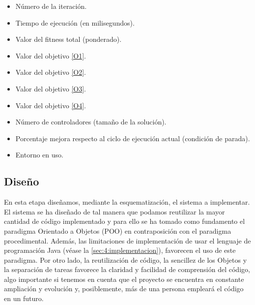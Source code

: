 \begin{enumerate}[label={\textbf{RIO\arabic*}}, ref={Requisito RIO\arabic*},  align=left]
\begin{enumerate}[label*={\textbf{.\arabic*}}]
\begin{itemize}
			\item Número de la iteración.
			\item Tiempo de ejecución (en milisegundos).
			\item Valor del fitness total (ponderado).
			\item Valor del objetivo \ref{O1}.
			\item Valor del objetivo \ref{O2}.
			\item Valor del objetivo \ref{O3}.
			\item Valor del objetivo \ref{O4}.
			\item Número de controladores (tamaño de la solución).
			\item Porcentaje mejora respecto al ciclo de ejecución actual (condición de parada).
			\item Entorno en uso.
		\end{itemize}
	\end{enumerate}
\end{enumerate}


\subsection{Diseño}
\label{sec:4:diseño}

En esta etapa diseñamos, mediante la esquematización, el sistema a implementar. 
El sistema se ha diseñado de tal manera que podamos reutilizar la mayor cantidad de código implementado y para ello se ha tomado como fundamento el paradigma Orientado a Objetos (POO) en contraposición con el paradigma procedimental. 
Además, las limitaciones de implementación de usar el lenguaje de programación Java (véase la \autoref{sec:4:implementacion}), favorecen el uso de este paradigma. 
Por otro lado, la reutilización de código, la sencillez de los Objetos y la separación de tareas favorece la claridad y facilidad de comprensión del código, algo importante si tenemos en cuenta que el proyecto se encuentra en constante ampliación y evolución y, posiblemente, más de una persona empleará el código en un futuro. 

